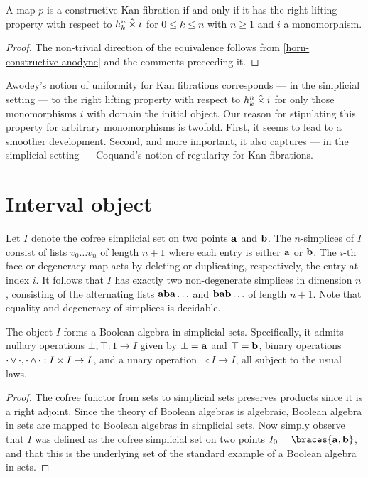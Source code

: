 \documentclass[reqno,10pt,a4paper,oneside]{amsart}
\begin{document}
\begin{proposition}
A map $p$ is a constructive Kan fibration if and only if it has the right lifting property with respect to $h_k^n \mathbin{\hat{\times}} i$ for $0 \leq k \leq n$ with $n \geq 1$ and $i$ a monomorphism.
\end{proposition}

\begin{proof}
The non-trivial direction of the equivalence follows from \cref{horn-constructive-anodyne} and the comments preceeding it.
\end{proof}

Awodey's notion of uniformity for Kan fibrations corresponds --- in the simplicial setting --- to the right lifting property with respect to $h_k^n \mathbin{\hat{\times}} i$ for only those monomorphisms $i$ with domain the initial object.
Our reason for stipulating this property for arbitrary monomorphisms is twofold.
First, it seems to lead to a smoother development.
Second, and more important, it also captures --- in the simplicial setting --- Coquand's notion of regularity for Kan fibrations.
\section{Interval object}

Let $I$ denote the cofree simplicial set on two points $\mathbf{a}$ and $\mathbf{b}$.
The $n$-simplices of $I$ consist of lists $v_0 \ldots v_n$ of length $n+1$ where each entry is either $\mathbf{a}$ or $\mathbf{b}$.
The $i$-th face or degeneracy map acts by deleting or duplicating, respectively, the entry at index $i$.
It follows that $I$ has exactly two non-degenerate simplices in dimension $n$, consisting of the alternating lists $\mathbf{a} \mathbf{b} \mathbf{a} \ldots$ and $\mathbf{b} \mathbf{a} \mathbf{b} \ldots$ of length $n+1$.
Note that equality and degeneracy of simplices is decidable.

\begin{lemma}
The object $I$ forms a Boolean algebra in simplicial sets.
Specifically, it admits nullary operations $\bot, \top : 1 \to I$ given by $\bot = \mathbf{a}$ and $\top = \mathbf{b}$, binary operations $\mathop{\cdot} \vee \mathop{\cdot}, \mathop{\cdot} \wedge \mathop{\cdot} : I \times I \to I$, and a unary operation $\neg : I \to I$, all subject to the usual laws.
\end{lemma}

\begin{proof}
The cofree functor from sets to simplicial sets preserves products since it is a right adjoint.
Since the theory of Boolean algebras is algebraic, Boolean algebra in sets are mapped to Boolean algebras in simplicial sets.
Now simply observe that $I$ was defined as the cofree simplicial set on two points $I_0 = \braces{\ptA, \ptB}$, and that this is the underlying set of the standard example of a Boolean algebra in sets.
\end{proof}
\end{document}
